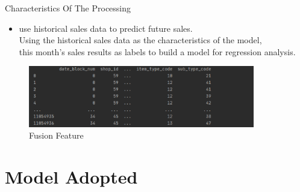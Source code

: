 \documentclass[
 size=14pt,
 paper=smartboard,  %
 mode=present, 		%
 display=slides, 	%
 style=tuliplab,  	%
 pauseslide,
 fleqn,leqno]{powerdot}
\begin{document}
\begin{slide}{Characteristics Of  The Processing}
  \begin{itemize}
    \item use historical sales data to predict future sales.\\
    Using the historical sales data as the characteristics of the model, \\
    this month's sales results as labels to build a model for regression analysis.
  
  \end{itemize}
  \begin{figure}[htbp]
    \centering
    \begin{minipage}[t]{0.48\textwidth}
      \centering
      \centerline{\includegraphics[width=0.88\textwidth]{logos/tezheng.eps}}
      \vspace{-1.0em}
      \caption{Fusion Feature}
    \end{minipage}
  \end{figure}
  \end{slide}




\section{Model Adopted}

\end{document}

